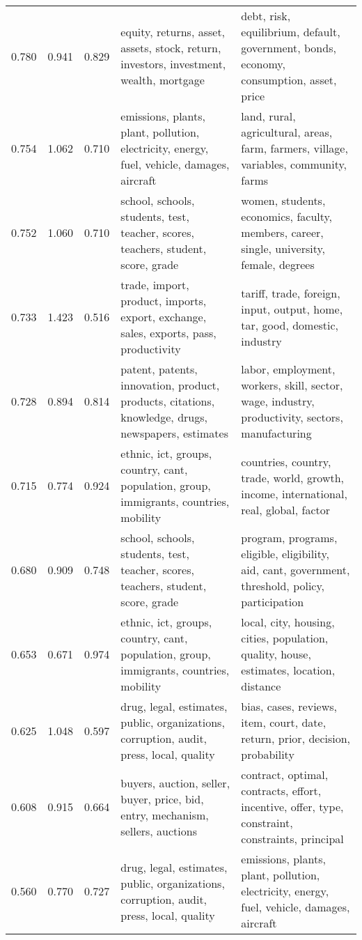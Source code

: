 \begin{tabular}{cccp{5cm}p{5cm}}
0.780 & 0.941 & 0.829 & equity, returns, asset, assets, stock, return, investors, investment, wealth, mortgage & debt, risk, equilibrium, default, government, bonds, economy, consumption, asset, price \\
0.754 & 1.062 & 0.710 & emissions, plants, plant, pollution, electricity, energy, fuel, vehicle, damages, aircraft & land, rural, agricultural, areas, farm, farmers, village, variables, community, farms \\
0.752 & 1.060 & 0.710 & school, schools, students, test, teacher, scores, teachers, student, score, grade & women, students, economics, faculty, members, career, single, university, female, degrees \\
0.733 & 1.423 & 0.516 & trade, import, product, imports, export, exchange, sales, exports, pass, productivity & tariff, trade, foreign, input, output, home, tar, good, domestic, industry \\
0.728 & 0.894 & 0.814 & patent, patents, innovation, product, products, citations, knowledge, drugs, newspapers, estimates & labor, employment, workers, skill, sector, wage, industry, productivity, sectors, manufacturing \\
0.715 & 0.774 & 0.924 & ethnic, ict, groups, country, cant, population, group, immigrants, countries, mobility & countries, country, trade, world, growth, income, international, real, global, factor \\
0.680 & 0.909 & 0.748 & school, schools, students, test, teacher, scores, teachers, student, score, grade & program, programs, eligible, eligibility, aid, cant, government, threshold, policy, participation \\
0.653 & 0.671 & 0.974 & ethnic, ict, groups, country, cant, population, group, immigrants, countries, mobility & local, city, housing, cities, population, quality, house, estimates, location, distance \\
0.625 & 1.048 & 0.597 & drug, legal, estimates, public, organizations, corruption, audit, press, local, quality & bias, cases, reviews, item, court, date, return, prior, decision, probability \\
0.608 & 0.915 & 0.664 & buyers, auction, seller, buyer, price, bid, entry, mechanism, sellers, auctions & contract, optimal, contracts, effort, incentive, offer, type, constraint, constraints, principal \\
0.560 & 0.770 & 0.727 & drug, legal, estimates, public, organizations, corruption, audit, press, local, quality & emissions, plants, plant, pollution, electricity, energy, fuel, vehicle, damages, aircraft \\

\end{tabular}
